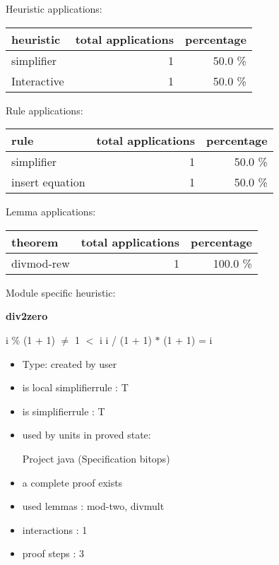 \documentclass[a4paper]{article}
\begin{document}
\medskip


Heuristic applications:

\begin{supertabular}{l|r|r}
heuristic	& total applications & percentage \\ \hline
simplifier & 1 & 50.0 \% \\
Interactive & 1 & 50.0 \% \\

\end{supertabular}

Rule applications:

\begin{supertabular}{l|r|r}
rule	        & total applications & percentage \\ \hline
simplifier & 1 & 50.0 \% \\
insert equation & 1 & 50.0 \% \\

\end{supertabular}

Lemma applications:

\begin{supertabular}{l|r|r}
theorem	        & total applications & percentage \\ \hline
divmod-rew & 1 & 100.0 \% \\

\end{supertabular}

Module specific heuristic:

\pagebreak

{\LARGE\bf div2zero}\label{lemma-div2zero}

\medskip

 \Fol i \% (1 + 1) $\neq$ 1  $<$ i \Imp i / (1 + 1) $*$ (1 + 1) = i

\begin{itemize}

\item Type: created by user

\item is local simplifierrule : T
\item is simplifierrule : T
\item used by units in proved state:

Project java (Specification bitops)
\item       a complete proof exists
\item       used lemmas  : mod-two, divmult
\item       interactions : 1
\item       proof steps  : 3
\end{itemize}
\end{document}
